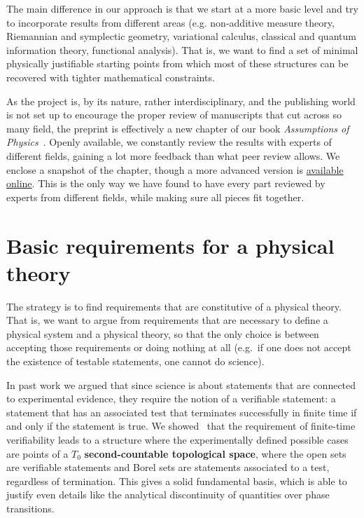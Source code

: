 \documentclass[10pt,twocolumn, nofootinbib]{revtex4-2}
\begin{document}
The main difference in our approach is that we start at a more basic level and try to incorporate results from different areas (e.g. non-additive measure theory, Riemannian and symplectic geometry, variational calculus, classical and quantum information theory, functional analysis). That is, we want to find a set of minimal physically justifiable starting points from which most of these structures can be recovered with tighter mathematical constraints.

As the project is, by its nature, rather interdisciplinary, and the publishing world is not set up to encourage the proper review of manuscripts that cut across so many field, the preprint is effectively a new chapter of our book \textit{Assumptions of Physics}~\cite{aop-book}. Openly available, we constantly review the results with experts of different fields, gaining a lot more feedback than what peer review allows. We enclose a snapshot of the chapter, though a more advanced version is  \href{https://latexonline.cc/compile?git=https%3A%2F%2Fgithub.com%2Fassumptionsofphysics%2Fbook&target=art_pm_EnsembleSpaces.tex&command=pdflatex}{available online}. This is the only way we have found to have every part reviewed by experts from different fields, while making sure all pieces fit together.

\section{Basic requirements for a physical theory}

The strategy is to find requirements that are constitutive of a physical theory. That is, we want to argue from requirements that are necessary to define a physical system and a physical theory, so that the only choice is between accepting those requirements or doing nothing at all (e.g.~if one does not accept the existence of testable statements, one cannot do science).

In past work we argued that since science is about statements that are connected to experimental evidence, they require the notion of a verifiable statement: a statement that has an associated test that terminates successfully in finite time if and only if the statement is true. We showed~\cite{aop-book,aop-math-topologydistinguishability} that the requirement of finite-time verifiability leads to a structure where the experimentally defined possible cases are points of a $T_0$ \textbf{second-countable topological space}, where the open sets are verifiable statements and Borel sets are statements associated to a test, regardless of termination. This gives a solid fundamental basis, which is able to justify even details like the analytical discontinuity of quantities over phase transitions.
\end{document}
